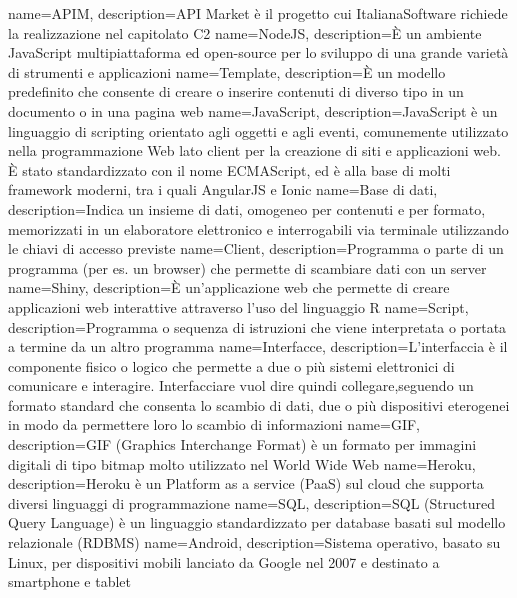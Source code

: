  {
	name=APIM,
	description={API Market è il progetto cui ItalianaSoftware richiede la realizzazione nel capitolato C2}
}
 {
	name=NodeJS,
	description={È un ambiente JavaScript multipiattaforma ed open-source per lo sviluppo di una grande varietà di strumenti e applicazioni}
}
 {
	name=Template,
	description={È un modello predefinito che consente di creare o inserire contenuti di diverso tipo in un documento o in una pagina web}
}
 {
	name=JavaScript,
	description={JavaScript è un linguaggio di scripting orientato agli oggetti e agli eventi, comunemente utilizzato nella programmazione Web lato client per la creazione di siti e applicazioni web. È stato standardizzato con il nome ECMAScript, ed è alla base di molti framework moderni, tra i quali AngularJS e Ionic}
}
 {
	name=Base di dati,
	description={Indica un insieme di dati, omogeneo per contenuti e per formato, memorizzati in un elaboratore elettronico e interrogabili via terminale utilizzando le chiavi di accesso previste}
}
 {
	name=Client,
	description={Programma o parte di un programma (per es. un browser) che permette di scambiare dati con un server}
}
 {
	name=Shiny,
	description={È un'applicazione web che permette di creare applicazioni web interattive attraverso l'uso del linguaggio R}
}
 {
	name=Script,
	description={Programma o sequenza di istruzioni che viene interpretata o portata a termine da un altro programma}
}
 {
	name=Interfacce,
	description={L'interfaccia è il componente fisico o logico che permette a due o più sistemi elettronici di comunicare e interagire. Interfacciare vuol dire quindi collegare,seguendo un formato standard che consenta lo scambio di dati, due o più dispositivi eterogenei in modo da permettere loro lo scambio di informazioni}
}
 {
	name=GIF,
	description={GIF (Graphics Interchange Format) è un formato per immagini digitali di tipo bitmap molto utilizzato nel World Wide Web}
}
 {
	name=Heroku,
	description={Heroku è un Platform as a service (PaaS) sul cloud che supporta diversi linguaggi di programmazione}
}
 {
	name=SQL,
	description={SQL (Structured Query Language) è un linguaggio standardizzato per database basati sul modello relazionale (RDBMS)}
}
 {
	name=Android,
	description={Sistema operativo, basato su Linux, per dispositivi mobili lanciato da Google nel 2007 e destinato a smartphone e tablet}
}

